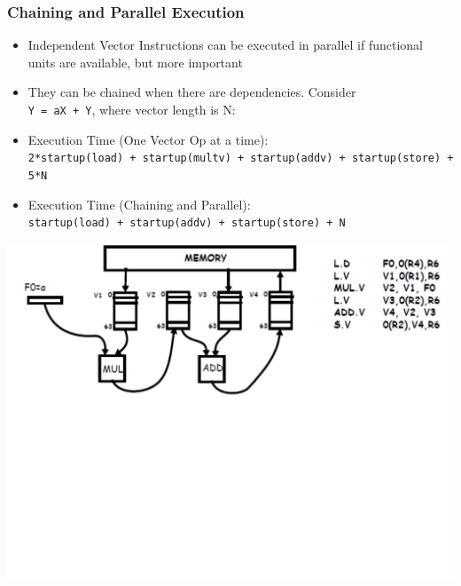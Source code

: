 \documentclass{beamer}
\begin{document}
\begin{frame}[fragile,t]
\frametitle{Chaining and Parallel Execution}

\begin{itemize}
    \item Independent Vector Instructions can be executed in parallel
            if functional units are available, but more important\smallskip
    \item They can be chained when there are dependencies. 
            Consider\\ {\tt Y = aX + Y}, where vector length is N:\smallskip

    \item Execution Time (One Vector Op at a time):\\
            {\tt 2*startup(load) + startup(multv) + startup(addv) + 
                    startup(store) + 5*N}\smallskip

    \item Execution Time (Chaining and Parallel):\\
            {\tt startup(load) + startup(addv) + startup(store) + N} 
\end  {itemize}

\includegraphics[width=59ex]{Ch1Figs/VectChaining}

\end{frame}
\end{document}
